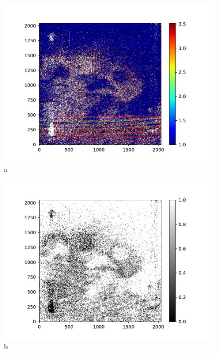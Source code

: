 \begin{figure}

\begin{center}
\begin{minipage}{.495\textwidth}
\begin{center}
\includegraphics[width=\textwidth]{Figures/cal_DARK_spirou_1.pdf}
a
\end{center}
\end{minipage}%
\begin{minipage}{.495\textwidth}
\begin{center}
\includegraphics[width=\textwidth]{Figures/cal_DARK_spirou_2.pdf}
b
\end{center}
\end{minipage}%
\end{center}


\end{figure}
